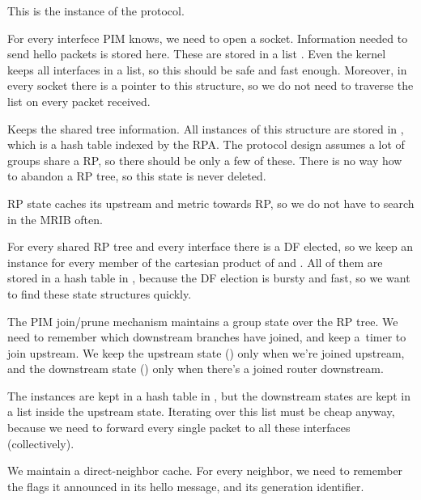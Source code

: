 \begin{description}[style=nextline]
\item[\ttt{pim\_proto}]
  This is the instance of the protocol.

\item[\ttt{pim\_iface}]
  For every interfece PIM knows, we need to open a socket. Information needed
  to send hello packets is stored here. These are stored in a list
  . Even the kernel keeps all interfaces in a list, so
  this should be safe and fast enough. Moreover, in every socket there is
  a pointer to this structure, so we do not need to traverse the list on every
  packet received.

\item[\ttt{pim\_rp}]
  Keeps the shared tree information. All instances of this structure are stored
  in , which is a hash table indexed by the RPA. The
  protocol design assumes a lot of groups share a RP, so there should be only
  a few of these. There is no way how to abandon a RP tree, so this state is
  never deleted.

  RP state caches its upstream and metric towards RP, so we do not have to
  search in the MRIB often.

\item[\ttt{pim\_rp\_iface}]
  For every shared RP tree and every interface there is a DF elected, so we
  keep an instance for every member of the cartesian product of  and
  . All of them are stored in a hash table in ,
  because the DF election is bursty and fast, so we want to find these state
  structures quickly.

\item[\ttt{pim\_grp}, \ttt{pim\_grp\_iface}]
  The PIM join/prune mechanism maintains a group state over the RP tree. We
  need to remember which downstream branches have joined, and keep a~timer to
  join upstream. We keep the upstream state () only when we're
  joined upstream, and the downstream state  () only when
  there's a joined router downstream.

  The  instances are kept in a hash table in , but the
  downstream states are kept in a list inside the upstream state. Iterating
  over this list must be cheap anyway, because we need to forward every single
  packet to all these interfaces (collectively).

\item[\ttt{pim\_neigh}]
  We maintain a direct-neighbor cache. For every neighbor, we need to remember
  the flags it announced in its hello message, and its generation identifier.

\end{description}

